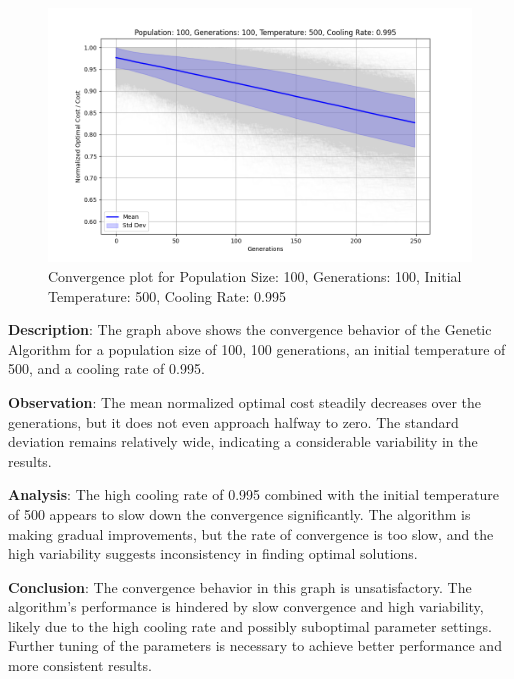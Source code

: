 \documentclass[
]{article}
\begin{document}
    \begin{figure}[H]
        \centering
        \includegraphics[width=\textwidth]{genetic_simulated_annealing_hybrid/Population_100_Generations_100_Temperature_500_CoolingRate_0.995}
        \caption{Convergence plot for Population Size: 100, Generations: 100, Initial Temperature: 500, Cooling Rate: 0.995}
        \label{fig:pop100_gen100_temp500_cr0.995}
    \end{figure}

    \textbf{Description}: The graph above shows the convergence behavior of the Genetic Algorithm for a population size of 100, 100 generations, an initial temperature of 500, and a cooling rate of 0.995.

    \textbf{Observation}: The mean normalized optimal cost steadily decreases over the generations, but it does not even approach halfway to zero. The standard deviation remains relatively wide, indicating a considerable variability in the results.

    \textbf{Analysis}: The high cooling rate of 0.995 combined with the initial temperature of 500 appears to slow down the convergence significantly. The algorithm is making gradual improvements, but the rate of convergence is too slow, and the high variability suggests inconsistency in finding optimal solutions.

    \textbf{Conclusion}: The convergence behavior in this graph is unsatisfactory. The algorithm's performance is hindered by slow convergence and high variability, likely due to the high cooling rate and possibly suboptimal parameter settings. Further tuning of the parameters is necessary to achieve better performance and more consistent results.
\end{document}
